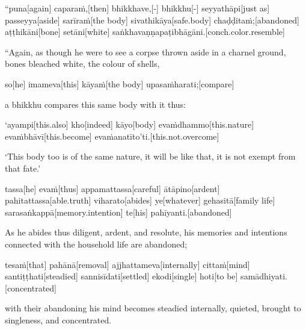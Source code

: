 \vskip 0.05in
\begin{samepage}
\begingl[glneveryline={\PaliGlossA,\PaliGlossB}]
“puna[again] caparaṁ,[then] bhikkhave,[-] bhikkhu[-] seyyathāpi[just as] passeyya[aside] sarīraṁ[the body] sivathikāya[safe.body] chaḍḍitaṁ;[abandoned] aṭṭhikāni[bone] setāni[white] saṅkhavaṇṇapaṭibhāgāni.[conch.color.resemble]
\endgl
\nopagebreak
\linespread{0.5}
\begin{spacin}{0.2}
{\PaliGlossFT “Again, as though he were to see a corpse thrown aside in a charnel ground, bones bleached white, the colour of shells,}
\end{spacin}
\vskip 12pt
\end{samepage}
\begin{samepage}
\begingl[glneveryline={\PaliGlossA,\PaliGlossB}]
so[he] imameva[this] kāyaṁ[the body] upasaṁharati;[compare]
\endgl
\nopagebreak
\linespread{0.5}
\begin{spacin}{0.2}
{\PaliGlossFT a bhikkhu compares this same body with it thus:}
\end{spacin}
\vskip 12pt
\end{samepage}
\begin{samepage}
\begingl[glneveryline={\PaliGlossA,\PaliGlossB}]
‘ayampi[this.also] kho[indeed] kāyo[body] evaṁdhammo[this.nature] evaṁbhāvī[this.become] evaṁanatīto’ti.[this.not.overcome]
\endgl
\nopagebreak
\linespread{0.5}
\begin{spacin}{0.2}
{\PaliGlossFT ‘This body too is of the same nature, it will be like that, it is not exempt from that fate.’}
\end{spacin}
\vskip 12pt
\end{samepage}
\begin{samepage}
\begingl[glneveryline={\PaliGlossA,\PaliGlossB}]
tassa[he] evaṁ[thus] appamattassa[careful] ātāpino[ardent] pahitattassa[able.truth] viharato[abides] ye[whatever] gehasitā[family life] sarasaṅkappā[memory.intention] te[his] pahīyanti.[abandoned]
\endgl
\nopagebreak
\linespread{0.5}
\begin{spacin}{0.2}
{\PaliGlossFT As he abides thus diligent, ardent, and resolute, his memories and intentions connected with the household life are abandoned;}
\end{spacin}
\vskip 12pt
\end{samepage}
\begin{samepage}
\begingl[glneveryline={\PaliGlossA,\PaliGlossB}]
tesaṁ[that] pahānā[removal] ajjhattameva[internally] cittaṁ[mind] santiṭṭhati[steadied] sannisīdati[settled] ekodi[single] hoti[to be] samādhiyati.[concentrated]
\endgl
\nopagebreak
\linespread{0.5}
\begin{spacin}{0.2}
{\PaliGlossFT with their abandoning his mind becomes steadied internally, quieted, brought to singleness, and concentrated.}
\end{spacin}
\vskip 12pt
\end{samepage}
